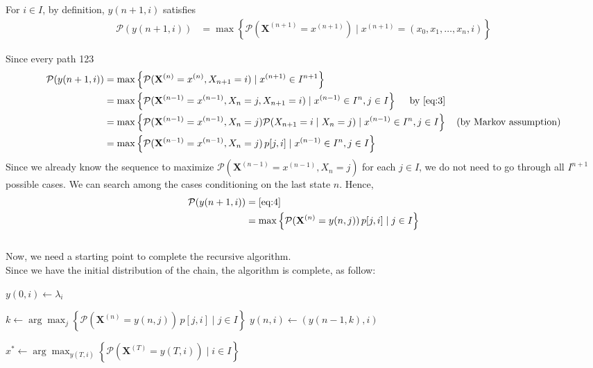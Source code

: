 \documentclass{article}
\begin{document}
For $i\in I$, by definition, $y(n+1,i)$ satisfies
\begin{align}
    \mathcal{P}(y(n+1, i)) &= \max\left\{\mathcal{P}(\mathbf{X}^{(n+1)}=x^{(n+1)})\mid x^{(n+1)}=(x_0,x_1,\dotsc,x_n,i)\right\}
\end{align}

Since every path 123
\begin{align}
    \mathcal{P}(y(n+1, i)) &= \max\left\{\mathcal{P}(\mathbf{X}^{(n)}=x^{(n)}, X_{n+1}=i)\mid x^{(n+1)}\in I^{n+1}\right\} \nonumber\\
    &= \max \left\{\mathcal{P}(\mathbf{X}^{(n-1)}=x^{(n-1)},X_n=j,X_{n+1}=i)\mid x^{(n-1)}\in I^{n}, j\in I \right\} \quad\text{ by \eqref{eq:3}}\nonumber\\
    &= \max \left\{\mathcal{P}(\mathbf{X}^{(n-1)}=x^{(n-1)},X_n=j)\mathcal{P}(X_{n+1}=i\mid X_n=j) \mid x^{(n-1)}\in I^{n}, j\in I \right\} \quad\text{(by Markov assumption)} \nonumber\\
    &= \max \left\{\mathcal{P}(\mathbf{X}^{(n-1)}=x^{(n-1)},X_n=j)\, p[j,i] \mid x^{(n-1)}\in I^{n}, j\in I \right\} \label{eq:4}
\end{align}
Since we already know the sequence to maximize $\mathcal{P}(\mathbf{X}^{(n-1)}=x^{(n-1)},X_n=j)$ for each $j\in I$, 
we do not need to go through all $I^{n+1}$ possible cases. We can search among the cases conditioning on the last state $n$. Hence,
\begin{align}
    \mathcal{P}(y(n+1, i)) &= \eqref{eq:4} \nonumber\\
    &= \max\left\{\mathcal{P}(\mathbf{X}^{(n)}=y(n,j))\,p[j,i] \mid j\in I \right\}
\end{align}
$ $\\
Now, we need a starting point to complete the recursive algorithm. \\
Since we have the initial distribution of the chain, 
the algorithm is complete, as follow:
\begin{algorithm}
    \begin{algorithmic}
            \State $y(0,i)\gets \lambda_i$
        \EndFor
    \end{algorithmic}
    \begin{algorithmic}
                \State $\displaystyle k\gets \arg\max_{j}\left\{\mathcal{P}(\mathbf{X}^{(n)}=y(n,j))\,p[j,i]\mid j\in I \right\}$
                \State $y(n,i)\gets (y(n-1,k),i)$
            \EndFor
        \EndFor
    \end{algorithmic}
    \begin{algorithmic}
        \State $\displaystyle x^*\gets \arg\max_{y(T,i)}\left\{\mathcal{P}(\mathbf{X}^{(T)}=y(T,i)) \mid i\in I\right\}$
    \end{algorithmic}
\end{algorithm}
\end{document}
